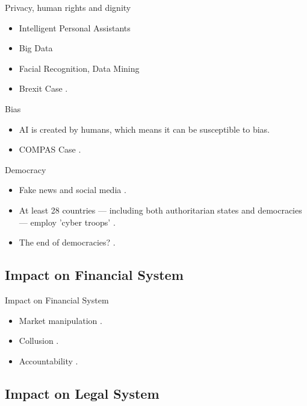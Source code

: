\documentclass{beamer}
\begin{document}
\begin{frame}{Privacy, human rights and dignity}
\begin{itemize}
    \item Intelligent Personal Assistants
    \item Big Data
    \item Facial Recognition, Data Mining
    \item Brexit Case \citep{cadwalladr2017revealed}.
\end{itemize}
\end{frame}


\begin{frame}{Bias}
\begin{itemize}
    \item AI is created by humans, which means it can be susceptible to bias.
    \item COMPAS Case \citep{kirchner2016machine}.
\end{itemize}
\end{frame}

\begin{frame}{Democracy}
\begin{itemize}
    \item Fake news and social media \citep{gorodnichenko2021social}.
    \item At least 28 countries — including both authoritarian states and democracies — employ 'cyber troops' \citep{bradshaw2017troops}.
    \item The end of democracies? \citep{bartlett2018people}.
\end{itemize}
\end{frame}



\subsection{Impact on Financial System}

\begin{frame}{Impact on Financial System}
\begin{itemize}
    \item Market manipulation \citep{spatt2014security}.
    \item Collusion \citep{ezrachi2017two}.
    \item Accountability \citep{wellman2017ethical}.
\end{itemize}
\end{frame}


\subsection{Impact on Legal System}
\end{document}
